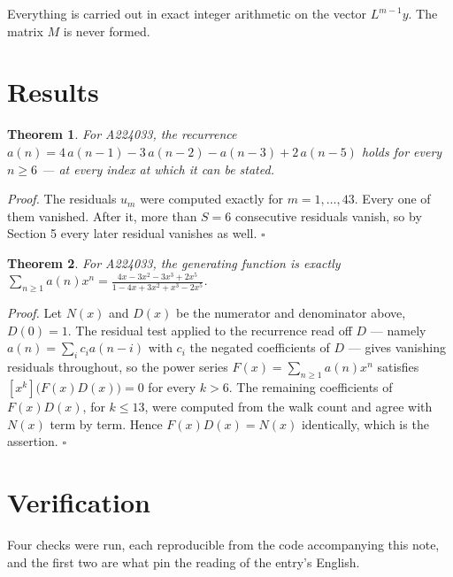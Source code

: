 \documentclass[11pt]{article}
\newtheorem{theorem}{Theorem}
\theoremstyle{definition}
\begin{document}
Everything is carried out in exact integer arithmetic on the vector $L^{m-1}y$. The matrix $M$ is never formed.

\section{Results}

\begin{theorem} For A224033, the recurrence $a(n) = 4\,a(n-1) - 3\,a(n-2) - a(n-3) + 2\,a(n-5)$ holds for every $n \ge 6$ --- at every index at which it can be stated.\end{theorem}

{\itshape Proof.} The residuals $u_m$ were computed exactly for $m = 1,\dots,43$. Every one of them vanished. After it, more than $S = 6$ consecutive residuals vanish, so by Section 5 every later residual vanishes as well. $\square$

\begin{theorem} For A224033, the generating function is exactly $\sum_{n\ge 1} a(n)x^n = \frac{4x - 3x^{2} - 3x^{3} + 2x^{5}}{1 - 4x + 3x^{2} + x^{3} - 2x^{5}}$.\end{theorem}

{\itshape Proof.} Let $N(x)$ and $D(x)$ be the numerator and denominator above, $D(0)=1$. The residual test applied to the recurrence read off $D$ --- namely $a(n) = \sum_i c_i a(n-i)$ with $c_i$ the negated coefficients of $D$ --- gives vanishing residuals throughout, so the power series $F(x)=\sum_{n\ge 1}a(n)x^n$ satisfies $[x^k]\bigl(F(x)D(x)\bigr) = 0$ for every $k > 6$. The remaining coefficients of $F(x)D(x)$, for $k \le 13$, were computed from the walk count and agree with $N(x)$ term by term. Hence $F(x)D(x) = N(x)$ identically, which is the assertion. $\square$

\section{Verification}

Four checks were run, each reproducible from the code accompanying this note, and the first two are what pin the reading of the entry's English.
\end{document}
